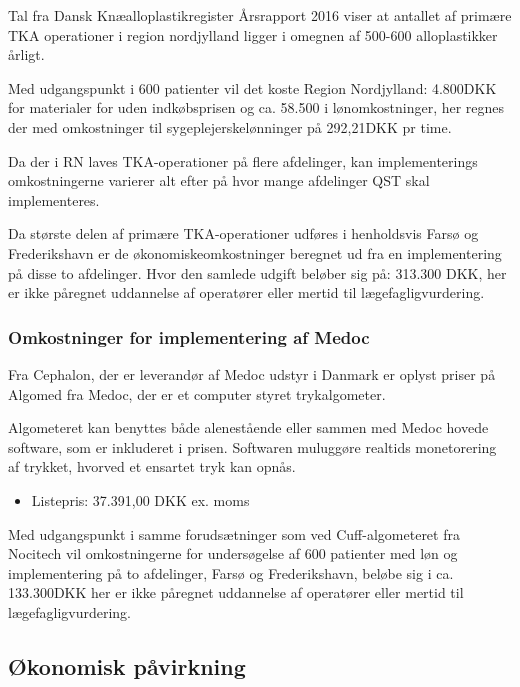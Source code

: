 Tal fra Dansk Knæalloplastikregister Årsrapport 2016 viser at antallet af primære TKA operationer i region nordjylland ligger i omegnen af 500-600 alloplastikker årligt.\citep{aarsrapport2016} 

Med udgangspunkt i 600 patienter vil det koste Region Nordjylland: 4.800DKK for materialer for uden indkøbsprisen og ca. 58.500 i lønomkostninger, her regnes der med omkostninger til sygeplejerskelønninger på 292,21DKK pr time.\citep{DST1}\citep{DST2}

Da der i RN laves TKA-operationer på flere afdelinger, kan implementerings omkostningerne varierer alt efter på hvor mange afdelinger QST skal implementeres. 

Da største delen af primære TKA-operationer udføres i henholdsvis Farsø og Frederikshavn er de økonomiskeomkostninger beregnet ud fra en implementering på disse to afdelinger. Hvor den samlede udgift beløber sig på: 313.300 DKK, her er ikke påregnet uddannelse af operatører eller mertid til lægefagligvurdering.

\subsubsection{Omkostninger for implementering af Medoc}
Fra Cephalon, der er leverandør af Medoc udstyr i Danmark er oplyst priser på Algomed fra Medoc, der er et computer styret trykalgometer.

Algometeret kan benyttes både alenestående eller sammen med Medoc hovede software, som er inkluderet i prisen. Softwaren muluggøre realtids monetorering af trykket, hvorved et ensartet tryk kan opnås.

\begin{itemize}  
\item Listepris: 37.391,00 DKK ex. moms
\end{itemize}

Med udgangspunkt i samme forudsætninger som ved Cuff-algometeret fra Nocitech vil omkostningerne for undersøgelse af 600 patienter med løn og implementering på to afdelinger, Farsø og Frederikshavn, beløbe sig i ca. 133.300DKK her er ikke påregnet uddannelse af operatører eller mertid til lægefagligvurdering.

\subsection{Økonomisk påvirkning}

